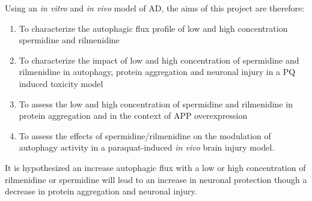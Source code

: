 Using an \textit{in vitro} and \textit{in vivo} model of AD, the aims of this project are therefore: 
\begin{enumerate}
\item To characterize the autophagic flux profile of low and high concentration spermidine and rilmenidine 
\item To characterize the impact of low and high concentration of spermidine and rilmenidine in autophagy, protein aggregation and neuronal injury in a PQ induced toxicity model
\item To assess the low and high concentration of spermidine and rilmenidine in protein aggregation and in the context of APP overexpression 
\item To assess the effects of spermidine/rilmenidine on the modulation of autophagy activity in a paraquat-induced \textit{in vivo} brain injury model. 
\end{enumerate}

It is hypothesized an increase autophagic flux with a low or high concentration of rilmenidine or spermidine will lead to an increase in neuronal protection though a decrease in protein aggregation and neuronal injury.



